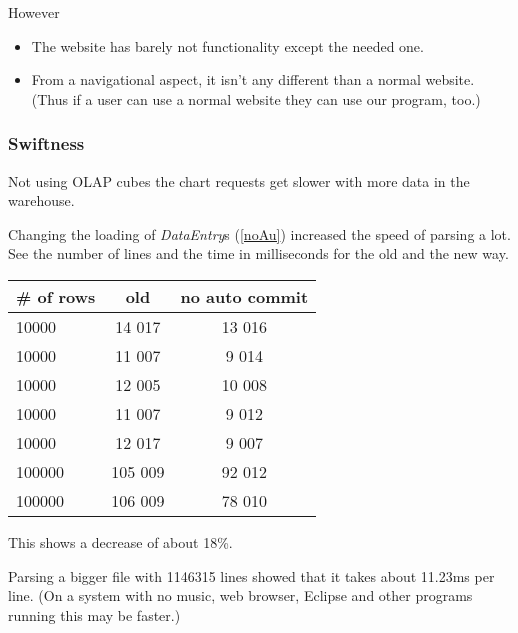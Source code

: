 However
\begin{itemize}
	\item The website has barely not functionality except the needed one.
	\item From a navigational aspect, it isn't any different than a normal website. (Thus if a user can use a normal website they can use our program, too.)
\end{itemize}



\subsubsection{Swiftness}
Not using OLAP cubes the chart requests get slower with more data in the warehouse. %

Changing the loading of \textit{DataEntry}s (\ref{noAu}) increased
the speed of parsing a lot. See the number of lines and the time in milliseconds
for the old and the new way.

\begin{tabular}{l|c|c}
\# of rows & old & no auto commit \\
\hline
10000& 14 017 & 13 016\\
10000&11 007 &9 014\\
10000&12 005&10 008\\
10000&11 007&9 012\\
10000&12 017&9 007\\
100000&105 009 &92 012\\
100000&106 009 &78 010\\
\end{tabular}

This shows a decrease of about 18\%.

Parsing a bigger file with 1146315 lines showed
that it takes about 11.23ms per line. (On a system with no music, web browser,
Eclipse and other programs running this may be faster.)
